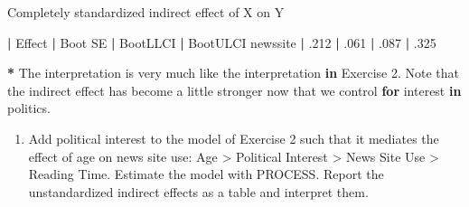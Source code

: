 \documentclass[a4paper]{book}
\newenvironment{Shaded}{\begin{snugshade}}{\end{snugshade}}
\newcommand{\DecValTok}[1]{\textcolor[rgb]{0.00,0.00,0.00}{#1}}
\newcommand{\StringTok}[1]{\textcolor[rgb]{0.00,0.00,0.00}{#1}}
\newcommand{\ControlFlowTok}[1]{\textcolor[rgb]{0.00,0.00,0.00}{\textbf{#1}}}
\newcommand{\OperatorTok}[1]{\textcolor[rgb]{0.00,0.00,0.00}{\textbf{#1}}}
\newcommand{\NormalTok}[1]{#1}
\providecommand{\tightlist}{%
  \setlength{\itemsep}{0pt}\setlength{\parskip}{0pt}}
\theoremstyle{definition}
\theoremstyle{definition}
\theoremstyle{definition}
\theoremstyle{remark}
\begin{document}
\begin{Shaded}
\begin{Highlighting}[]
\NormalTok{Completely standardized indirect effect of X on Y   }

          \OperatorTok{|}\StringTok{  }\NormalTok{Effect  }\OperatorTok{|}\StringTok{  }\NormalTok{Boot SE  }\OperatorTok{|}\StringTok{  }\NormalTok{BootLLCI  }\OperatorTok{|}\StringTok{  }\NormalTok{BootULCI  }
\NormalTok{newssite  }\OperatorTok{|}\StringTok{  }\NormalTok{.}\DecValTok{212}    \OperatorTok{|}\StringTok{  }\NormalTok{.}\DecValTok{061}     \OperatorTok{|}\StringTok{  }\NormalTok{.}\DecValTok{087}      \OperatorTok{|}\StringTok{  }\NormalTok{.}\DecValTok{325}  

\OperatorTok{*}\StringTok{ }\NormalTok{The interpretation is very much like the interpretation }\ControlFlowTok{in}\NormalTok{ Exercise }\DecValTok{2}\NormalTok{. Note}
\NormalTok{that the indirect effect has become a little stronger now that we control }\ControlFlowTok{for}
\NormalTok{interest }\ControlFlowTok{in}\NormalTok{ politics.}
\end{Highlighting}
\end{Shaded}

\begin{enumerate}
\def\labelenumi{\arabic{enumi}.}
\setcounter{enumi}{3}
\tightlist
\item
  Add political interest to the model of Exercise 2 such that it
  mediates the effect of age on news site use: Age \textgreater{}
  Political Interest \textgreater{} News Site Use \textgreater{} Reading
  Time. Estimate the model with PROCESS. Report the unstandardized
  indirect effects as a table and interpret them.
\end{enumerate}
\end{document}
